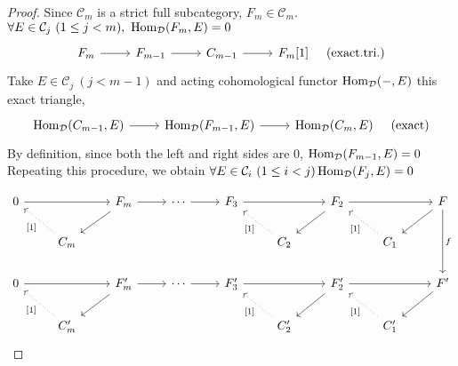 \documentclass[leqno]{ltjsarticle}
\begin{document}
\begin{proof}
	Since $\mathcal C_m$ is a strict full subcategory, $F_m\in\mathcal C_m$.
	$\forall E\in\mathcal C_j\ (1\le j<m),\ \Hom_{\mathcal D}(F_m,E)=0$ \\
	\[
	\begin{tikzcd}
		F_{m}\ar[r]&F_{m-1}\ar[r]&C_{m-1}\ar[r]&F_m[1]\hspace{5mm} \text{(exact.tri.)}
	\end{tikzcd}
\]
Take $E\in\mathcal C_j\ (j<m-1)$ and acting cohomological functor $\operatorname{\mathrm{Hom}}_{\mathcal D}(-,E)$ this exact triangle,
	\[
	\begin{tikzcd}
		\Hom_{\mathcal D}(C_{m-1},E)\ar[r]&\Hom_{\mathcal D}(F_{m-1},E)\ar[r]&\Hom_{\mathcal D}(C_{m},E)\hspace{5mm}\text{(exact)}
	\end{tikzcd}
\]
		By definition, since both the left and right sides are 0, $\operatorname{\mathrm{Hom}}_{\mathcal D}(F_{m-1},E)=0$\\
		Repeating this procedure, we obtain $\forall E\in \mathcal C_i\  (1\le i<j)\operatorname{\mathrm{Hom}}_{\mathcal D}(F_j,E) = 0$

	\[
		\begin{tikzcd}
			0\ar[rr]& & F_{m}\ar[r]\ar[ld] &\cdots\ar[r] &F_{3}\ar[rr]&&F_{2}\ar[ld]\ar[rr]&&F\ar[ld]\ar[dd,"f"]\\
								 &C_{m}\ar[lu,dotted,"{[1]}"] &&&&C_2\ar[lu,dotted,"{[1]}"]&&C_1\ar[lu,dotted,"{[1]}"]\\
			0\ar[rr]& & F'_{m}\ar[r]\ar[ld] &\cdots\ar[r] &F'_{3}\ar[rr]&&F'_{2}\ar[ld]\ar[rr]&&F'\ar[ld]\\
								 &C'_{m}\ar[lu,dotted,"{[1]}"] &&&&C'_2\ar[lu,dotted,"{[1]}"]&&C'_1\ar[lu,dotted,"{[1]}"]
		\end{tikzcd}
	\]


\end{proof}
\end{document}
